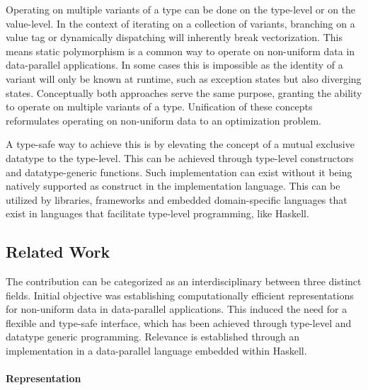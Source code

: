\documentclass{article}
\begin{document}
Operating on multiple variants of a type can be done on the type-level or on the value-level.
In the context of iterating on a collection of variants, branching on a value tag or dynamically dispatching will inherently break vectorization.
This means static polymorphism is a common way to operate on non-uniform data in data-parallel applications.
In some cases this is impossible as the identity of a variant will only be known at runtime, such as exception states but also diverging states.
Conceptually both approaches serve the same purpose, granting the ability to operate on multiple variants of a type.
Unification of these concepts reformulates operating on non-uniform data to an optimization problem.

A type-safe way to achieve this is by elevating the concept of a mutual exclusive datatype to the type-level.
This can be achieved through type-level constructors and datatype-generic functions.
Such implementation can exist without it being natively supported as construct in the implementation language.
This can be utilized by libraries, frameworks and embedded domain-specific languages that exist in languages that facilitate type-level programming, like Haskell.

\newpage

\subsection{Related Work}

The contribution can be categorized as an interdisciplinary between three distinct fields.
Initial objective was establishing computationally efficient representations for non-uniform data in data-parallel applications.
This induced the need for a flexible and type-safe interface, which has been achieved through type-level and datatype generic programming.
Relevance is established through an implementation in a data-parallel language embedded within Haskell.

\paragraph{Representation}
\end{document}
